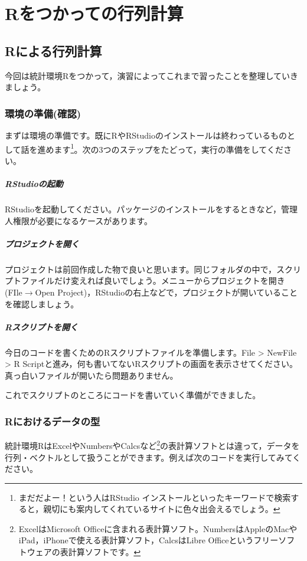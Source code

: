 \documentclass{ltjsbook}
\begin{document}
 
\chapter{Rをつかっての行列計算} 
\label{chapter9}
\section{Rによる行列計算}

今回は統計環境Rをつかって，演習によってこれまで習ったことを整理していきましょう。
\subsection{環境の準備(確認)}
まずは環境の準備です。既にRやRStudioのインストールは終わっているものとして話を進めます\footnote{まだだよー！という人はRStudio インストールといったキーワードで検索すると，親切にも案内してくれているサイトに色々出会えるでしょう。}。次の3つのステップをたどって，実行の準備をしてください。
\paragraph{RStudioの起動}RStudioを起動してください。パッケージのインストールをするときなど，管理人権限が必要になるケースがあります。
\paragraph{プロジェクトを開く}プロジェクトは前回作成した物で良いと思います。同じフォルダの中で，スクリプトファイルだけ変えれば良いでしょう。メニューからプロジェクトを開き(FIle$\to$Open Project)，RStudioの右上などで，プロジェクトが開いていることを確認しましょう。
\paragraph{Rスクリプトを開く}今日のコードを書くためのRスクリプトファイルを準備します。File > NewFile > R Scriptと進み，何も書いてないRスクリプトの画面を表示させてください。真っ白いファイルが開いたら問題ありません。

これでスクリプトのところにコードを書いていく準備ができました。
\subsection{Rにおけるデータの型}
統計環境RはExcelやNumbersやCalcsなど\footnote{ExcelはMicrosoft Officeに含まれる表計算ソフト。NumbersはAppleのMacやiPad，iPhoneで使える表計算ソフト，CalcsはLibre Officeというフリーソフトウェアの表計算ソフトです。}の表計算ソフトとは違って，データを行列・ベクトルとして扱うことができます。例えば次のコードを実行してみてください。
\end{document}

